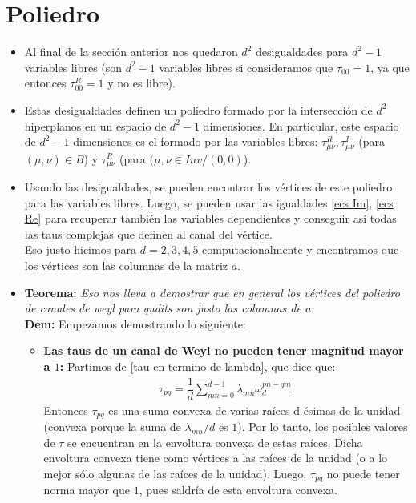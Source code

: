 \section*{Poliedro}
\begin{itemize}
\item Al final de la sección anterior nos quedaron $d^2$ desigualdades para $d^2-1$ variables libres (son $d^2-1$ variables libres si consideramos que $\tau_{00} = 1$, ya que entonces $\tau_{00}^R = 1$ y no es libre). 
\item Estas desigualdades definen un poliedro formado por la intersección de $d^2$ hiperplanos en un espacio de $d^2-1$ dimensiones.
En particular, este espacio de $d^2-1$ dimensiones es el formado por
las variables libres: $\tau_{\mu\nu}^R, \tau_{\mu\nu}^I$ (para $(\mu,\nu)\in B$) y $\tau_{\mu\nu}^R$ (para $(\mu,\nu \in Inv / (0,0)$).

\item Usando las desigualdades, se pueden encontrar los vértices de este poliedro para las variables libres. 
Luego, se pueden usar las igualdades \ref{ecs Im}, \ref{ecs Re} para recuperar también las variables dependientes 
y conseguir así  todas las taus complejas que definen al canal del vértice. \\

Eso justo hicimos para $d=2,3,4,5$ computacionalmente y encontramos que los vértices son las columnas de la matriz $a$. \\

\item\textbf{Teorema:} \textit{Eso nos lleva a demostrar que en general los vértices del poliedro de canales de weyl para qudits son justo las columnas de $a$}: \\

\textbf{Dem:} Empezamos demostrando lo siguiente:
\begin{itemize}
\item \textbf{Las taus de un canal de Weyl  no pueden tener magnitud mayor a $1$:} Partimos de \ref{tau en termino de lambda}, que dice que:
\begin{align*}
\tau_{pq} = \dfrac{1}{d} \sum_{mn=0}^{d-1} \lambda_{mn} \omega_d^{pn-qm}.
\end{align*}
Entonces $\tau_{pq}$ es una suma convexa de varias raíces d-ésimas de la unidad
(convexa porque la suma de $\lambda_{mn}/d $ es $1$). 
Por lo tanto, los posibles valores de $\tau$ se encuentran en la envoltura convexa
 de estas raíces. Dicha envoltura convexa tiene como vértices a las raíces de la unidad 
 (o a lo mejor sólo algunas de las raíces de la unidad).
 Luego, $\tau_{pq}$ no puede tener norma mayor que $1$, pues saldría de esta envoltura convexa.  \\
 

\end{itemize}
\end{itemize}
